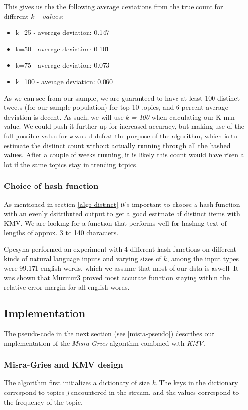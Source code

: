 This gives us the the following average deviations from the true count for different $k-values$:
\begin{itemize}
    \item k=25 - average deviation: 0.147
    \item k=50 - average deviation: 0.101
    \item k=75 - average deviation: 0.073
    \item k=100 - average deviation: 0.060
\end{itemize}

As we can see from our sample, we are guaranteed to have at least 100 distinct tweets (for our sample population) for top 10 topics, and 6 percent average deviation is decent. As such, we will use \textit{k = 100} when calculating our K-min value. We could push it further up for increased accuracy, but making use of the full possible value for \textit{k} would defeat the purpose of the algorithm, which is to estimate the distinct count without actually running through all the hashed values. After a couple of weeks running, it is likely this count would have risen a lot if the same topics stay in trending topics.

\subsubsection{Choice of hash function}\label{hash-function}
As mentioned in section \ref{algo-distinct} it's important to choose a hash function with an evenly dsitributed output to get a good estimate of distinct items with KMV. We are looking for a function that performs well for hashing text of lengths of approx. 3 to 140 characters. 

Cpesyna \cite{KMV1} performed an experiment with 4 different hash functions on different kinds of natural language inputs and varying sizes of $k$, among the input types were 99.171 english words, which we assume that most of our data is aswell. It was shown that Murmur3 proved most accurate function staying within the relative error margin for all english words.

\subsection{Implementation}\label{algo-data}
The pseudo-code in the next section (see \ref{misra-pseudo}) describes our implementation of the \textit{Misra-Gries} algorithm combined with \textit{KMV}.  

\subsubsection{Misra-Gries and KMV design}\label{misra-gries}
The algorithm first initializes a dictionary of size \textit{k}. The keys in the dictionary correspond to topics \textit{j} encountered in the stream, and the values correspond to the frequency  of the topic. 

